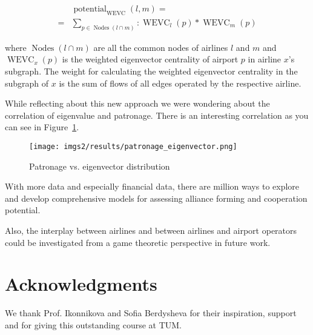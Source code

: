 \documentclass[twocolumn]{tum-article}
\DeclareMathOperator{\Potential}{potential}
\DeclareMathOperator{\WEVC}{WEVC}
\DeclareMathOperator{\Nodes}{Nodes}
\begin{document}
\begin{equation}
\begin{aligned}
& \Potential_{\WEVC}(l, m) = \\
 = & \sum_{p \in \Nodes(l \cap m)}: \WEVC_{l}(p) * \WEVC_{m}(p)
\end{aligned}
\end{equation}

where $\Nodes(l \cap m)$ are all the common nodes of airlines $l$ and $m$ and $\WEVC_{x}(p)$ is the weighted eigenvector centrality of airport $p$ in airline $x$'s subgraph. 
The weight for calculating the weighted eigenvector centrality in the subgraph of $x$ is the sum of flows of all edges operated by the respective airline. 

While reflecting about this new approach we were wondering about the correlation of eigenvalue and patronage. There is an interesting correlation as you can see in Figure~\ref{fig:patronage_eigenvector}.

\begin{figure}
	\centering
	\texttt{[image: imgs2/results/patronage\_eigenvector.png]}
	\caption{
	Patronage vs. eigenvector distribution}
\label{fig:patronage_eigenvector}
\end{figure}


With more data and especially financial data, there are million ways to explore and develop comprehensive models for assessing alliance forming and cooperation potential. 

Also, the interplay between airlines and between airlines and airport operators could be investigated from a game theoretic perspective in future work. 

\section*{Acknowledgments}
We thank Prof. Ikonnikova and Sofia Berdysheva for their inspiration, support and for giving this outstanding course at TUM. 
\\\\\\\\\\\\\\\\\\\\\\\\\\\\


\end{document}
